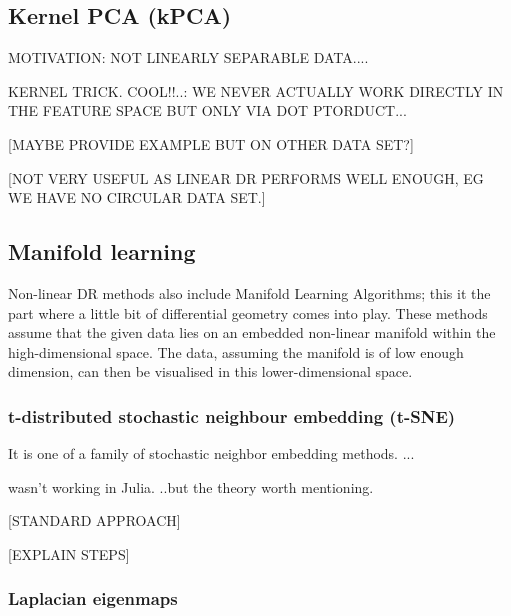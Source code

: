 \documentclass[journal, a4paper]{IEEEtran}
\begin{document}
\subsection{Kernel PCA (kPCA)}

MOTIVATION: NOT LINEARLY SEPARABLE DATA....

KERNEL TRICK. COOL!!..: WE NEVER ACTUALLY WORK DIRECTLY IN THE FEATURE SPACE BUT ONLY VIA DOT PTORDUCT...


[MAYBE PROVIDE EXAMPLE BUT ON OTHER DATA SET?]

[NOT VERY USEFUL AS LINEAR DR PERFORMS WELL ENOUGH, EG WE HAVE NO CIRCULAR DATA SET.] 



\subsection{Manifold learning}

Non-linear DR methods also include Manifold Learning Algorithms; this it the part where a little bit of differential geometry comes into play. These methods assume that the given data lies on an embedded non-linear manifold within the high-dimensional space. The data, assuming the manifold is of low enough dimension, can then be visualised in this lower-dimensional space.


\subsubsection{t-distributed stochastic neighbour embedding (t-SNE)}
It is one of a family of stochastic neighbor embedding methods.
...

wasn't working in Julia. ..but the theory worth mentioning.


[STANDARD APPROACH]


[EXPLAIN STEPS]





\subsubsection{Laplacian eigenmaps}
\end{document}
